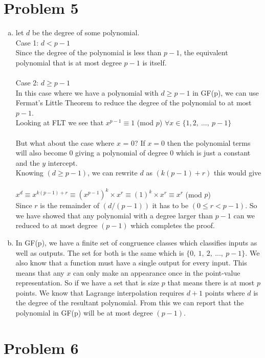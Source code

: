 \documentclass[11pt,letterpaper]{article}
\begin{document}
\section*{Problem 5}
\begin{enumerate}[(a)]
\item
let $d$ be the degree of some polynomial.\\
Case 1: $d < p-1$\\
Since the degree of the polynomial is less than $p-1$, the equivalent polynomial that is at most degree $p-1$ is itself.\\\\
Case 2: $d\geq p-1$\\
In this case where we have a polynomial with $d\geq p-1$ in GF(p), we can use Fermat's Little Theorem to reduce the degree of the polynomial to at most $p-1$.\\
Looking at FLT we see that $x^{p-1} \equiv 1$ (mod $p$) $\forall x \in \{1,2,~...,~p-1\}$\\
\\
But what about the case where $x$ = 0? If $x=0$ then the polynomial terms will also become 0 giving a polynomial of degree 0 which is just a constant and the $y$ intercept.\\
Knowing $(d\geq p-1)$, we can rewrite $d$ as $(k(p-1)+r)$ this would give\\\\
$x^d \equiv x^{k(p-1) +r} \equiv (x^{p-1})^k \times x^{r} \equiv (1)^k \times x^r \equiv x^r$ (mod $p$)\\
Since $r$ is the remainder of $(d/(p-1))$ it has to be $(0\leq r < p-1)$. So we have showed that any polynomial with a degree larger than $p-1$ can we reduced to at most degree $(p-1)$ which completes the proof.
\item
In GF(p), we have a finite set of congruence classes which classifies inputs as well as outputs. The set for both is the same which is $\{0,~1,~2,~...,~p-1\}$. We also know that a function must have a single output for every input. This means that any $x$ can only make an appearance once in the point-value representation. So if we have a set that is size $p$ that means there is at most $p$ points. We know that Lagrange interpolation requires $d+1$ points where $d$ is the degree of the resultant polynomial. From this we can report that the polynomial in GF(p) will be at most degree $(p-1)$.
\end{enumerate}
\clearpage
\section*{Problem 6}
\end{document}
